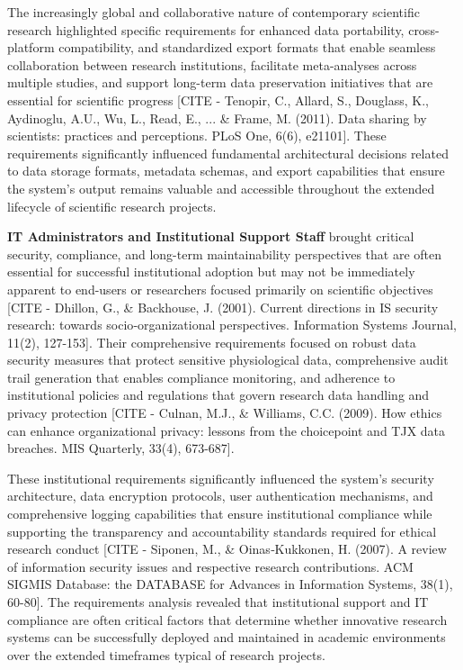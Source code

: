 \documentclass[12pt,a4paper]{report}
\begin{document}
The increasingly global and collaborative nature of contemporary scientific research highlighted specific requirements
for enhanced data portability, cross-platform compatibility, and standardized export formats that enable seamless
collaboration between research institutions, facilitate meta-analyses across multiple studies, and support long-term
data preservation initiatives that are essential for scientific
progress [CITE - Tenopir, C., Allard, S., Douglass, K., Aydinoglu, A.U., Wu, L., Read, E., ... \& Frame, M. (2011). Data sharing by scientists: practices and perceptions. PLoS One, 6(6), e21101].
These requirements significantly influenced fundamental architectural decisions related to data storage formats,
metadata schemas, and export capabilities that ensure the system's output remains valuable and accessible throughout the
extended lifecycle of scientific research projects.

\textbf{IT Administrators and Institutional Support Staff} brought critical security, compliance, and long-term
maintainability perspectives that are often essential for successful institutional adoption but may not be immediately
apparent to end-users or researchers focused primarily on scientific
objectives [CITE - Dhillon, G., \& Backhouse, J. (2001). Current directions in IS security research: towards socio‐organizational perspectives. Information Systems Journal, 11(2), 127-153].
Their comprehensive requirements focused on robust data security measures that protect sensitive physiological data,
comprehensive audit trail generation that enables compliance monitoring, and adherence to institutional policies and
regulations that govern research data handling and privacy
protection [CITE - Culnan, M.J., \& Williams, C.C. (2009). How ethics can enhance organizational privacy: lessons from the choicepoint and TJX data breaches. MIS Quarterly, 33(4), 673-687].

These institutional requirements significantly influenced the system's security architecture, data encryption protocols,
user authentication mechanisms, and comprehensive logging capabilities that ensure institutional compliance while
supporting the transparency and accountability standards required for ethical research
conduct [CITE - Siponen, M., \& Oinas‐Kukkonen, H. (2007). A review of information security issues and respective research contributions. ACM SIGMIS Database: the DATABASE for Advances in Information Systems, 38(1), 60-80].
The requirements analysis revealed that institutional support and IT compliance are often critical factors that
determine whether innovative research systems can be successfully deployed and maintained in academic environments over
the extended timeframes typical of research projects.
\end{document}
